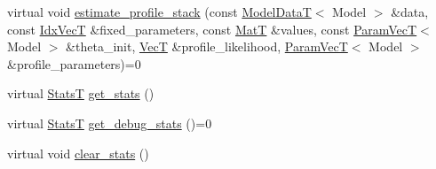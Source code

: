 \begin{DoxyCompactItemize}
\item 
virtual void \hyperlink{classmappel_1_1Estimator_aa86d466843e5dae1e2eaaecb98012ff4}{estimate\+\_\+profile\+\_\+stack} (const \hyperlink{namespacemappel_a97f050df953605381ae9c901c3b125f1}{Model\+DataT}$<$ Model $>$ \&data, const \hyperlink{namespacemappel_ac63743dcd42180127307cd0e4ecdd784}{Idx\+VecT} \&fixed\+\_\+parameters, const \hyperlink{namespacemappel_a7091ab87c528041f7e2027195fad8915}{MatT} \&values, const \hyperlink{namespacemappel_a0f86d3153e4e27b095012f140eea58de}{Param\+VecT}$<$ Model $>$ \&theta\+\_\+init, \hyperlink{namespacemappel_a2225ad69f358daa3f4f99282a35b9a3a}{VecT} \&profile\+\_\+likelihood, \hyperlink{namespacemappel_a0f86d3153e4e27b095012f140eea58de}{Param\+VecT}$<$ Model $>$ \&profile\+\_\+parameters)=0
\item 
virtual \hyperlink{namespacemappel_a04ab395b0cf82c4ce68a36b2212649a5}{StatsT} \hyperlink{classmappel_1_1Estimator_a876af9a1a1a6bf174c63716f3348d735}{get\+\_\+stats} ()
\item 
virtual \hyperlink{namespacemappel_a04ab395b0cf82c4ce68a36b2212649a5}{StatsT} \hyperlink{classmappel_1_1Estimator_a64b26c846a0e995fe16cd56cbead9f99}{get\+\_\+debug\+\_\+stats} ()=0
\item 
virtual void \hyperlink{classmappel_1_1Estimator_a2181f8c34bfc89b5b6b491f4db63a4d8}{clear\+\_\+stats} ()
\end{DoxyCompactItemize}
